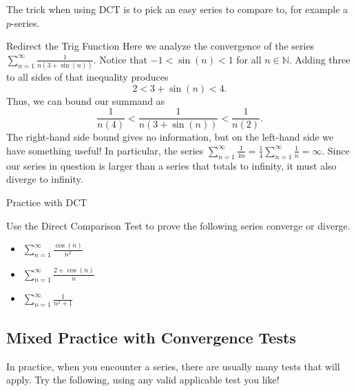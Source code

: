 The trick when using DCT is to pick an easy series to compare to, for example a $p$-series.  

\begin{example}{Redirect the Trig Function}
Here we analyze the convergence of the series $\sum_{n=1}^\infty \frac{1}{n\left(3+\sin(n)\right)}. $  Notice that $-1<\sin(n)<1 $ for all $n\in\mathbb{N}$.  Adding three to all sides of that inequality produces $$ 2<3+\sin(n)<4.$$  Thus, we can bound our summand as $$ \frac{1}{n\left(4\right)}<\frac{1}{n\left(3+\sin(n)\right)}<\frac{1}{n\left(2\right)}.$$
The right-hand side bound gives no information, but on the left-hand side we have something useful!  In particular, the series $\sum_{n=1}^\infty\frac{1}{4n}=\frac{1}{4}\sum_{n=1}^\infty\frac{1}{n}=\infty$.  Since our series in question is larger than a series that totals to infinity, it must also diverge to infinity.
\end{example}

\begin{exercise}{Practice with DCT \Coffeecup \Coffeecup}

Use the Direct Comparison Test to prove the following series converge or diverge.

\begin{itemize}

\item $\sum_{n=1}^\infty \frac{\cos(n)}{n^2}$

\vspace*{1.5in}

\item  $\sum_{n=1}^\infty \frac{2+\cos(n)}{n}$

\vspace*{1.5in} 

\item  $\sum_{n=1}^\infty \frac{1}{n^2+1}$

\vspace*{1.5in} 
\end{itemize}
\end{exercise}

\subsection{Mixed Practice with Convergence Tests}
In practice, when you encounter a series, there are usually many tests that will apply.  Try the following, using any valid applicable test you like!

